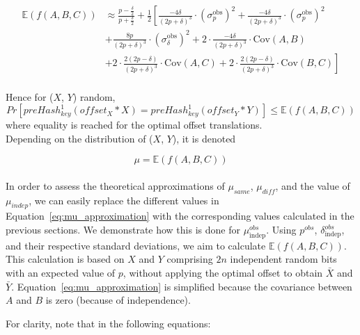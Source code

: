 \begin{equation}
    \begin{aligned}
    \mathbb{E}(f(A,B,C)) &\approx \frac{p - \frac{\delta}{2}}{p + \frac{\delta}{2}} + \frac{1}{2} \left[ \frac{-4\delta}{(2p + \delta)^3}\cdot({\sigma^\text{obs}_p})^2 + \frac{-4\delta}{(2p + \delta)^3}\cdot({\sigma^\text{obs}_p})^2 \right. \\[2mm]
    & \left. + \frac{8p}{(2p + \delta)^3}\cdot({\sigma^\text{obs}_\delta})^2 + 2\cdot\frac{-4\delta}{(2p + \delta)^3}\cdot\text{Cov}(A,B) \right. \\[2mm]
    & \left. + 2\cdot\frac{2(2p - \delta)}{(2p + \delta)^3}\cdot\text{Cov}(A,C) + 2\cdot\frac{2(2p - \delta)}{(2p + \delta)^3}\cdot\text{Cov}(B,C) \right]\\
    \end{aligned}
    \label{eq:mu_approximation}
\end{equation}

Hence for (\(X\), \(Y\)) random,
\begin{equation}
    \label{eq:mu_leq}
    Pr[preHash_{key}^1(offset_X * X) = preHash_{key}^1(offset_Y * Y)] \leq \mathbb{E}(f(A,B,C))
\end{equation}
where equality is reached for the optimal offset translations.\\

Depending on the distribution of (\(X\), \(Y\)), it is denoted

\begin{equation} \label{eq:mu}
    \mu = \mathbb{E}(f(A,B,C))
\end{equation}\\

In order to assess the theoretical approximations of $\mu_{same}$, $\mu_{diff}$, and the value of $\mu_{indep}$, we can easily replace the different values in Equation~\ref{eq:mu_approximation} with the corresponding values calculated in the previous sections. We demonstrate how this is done for \( \mu_{\text{indep}}^{obs} \). Using \( p^{obs} \), \(\delta_{\text{indep}}^{obs}\), and their respective standard deviations, we aim to calculate \(\mathbb{E}(f(A,B,C))\). This calculation is based on \(X\) and \(Y\) comprising \(2n\) independent random bits with an expected value of \(p\), without applying the optimal offset to obtain \(\bar{X}\) and \(\bar{Y}\). Equation~\ref{eq:mu_approximation} is simplified because the covariance between \(A\) and \(B\) is zero (because of independence).

For clarity, note that in the following equations:

